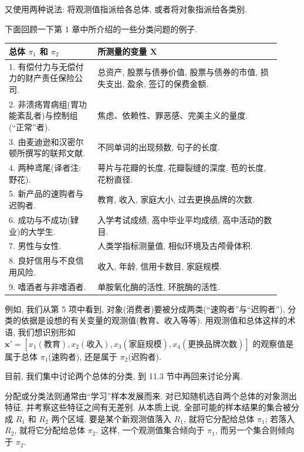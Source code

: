 
又使用两种说法: 将观测值指派给各总体, 或者将对象指派给各类别.

下面回顾一下第 1 章中所介绍的一些分类问题的例子.

\begin{mvtable}
\begin{tabular}{@{}p{0.30\linewidth}p{0.62\linewidth}@{}}
\toprule
总体 $\pi_1$ 和 $\pi_2$ & 所测量的变量 $\mathbf{X}$\\
\midrule
1. 有偿付力与无偿付力的财产责任保险公司. & 总资产, 股票与债券价值, 股票与债券的市值, 损失支出, 盈余, 签订的保费金额.\\
2. 非溃疡胃病组(胃功能紊乱者)与控制组(“正常”者). & 焦虑、依赖性、罪恶感、完美主义的量度.\\
3. 由麦迪逊和汉密尔顿所撰写的联邦文献. & 不同单词的出现频数, 句子的长度.\\
4. 两种鸢尾(译者注: 野花). & 萼片与花瓣的长度, 花瓣裂缝的深度, 苞的长度, 花粉直径.\\
5. 新产品的速购者与迟购者. & 教育, 收入, 家庭大小, 过去更换品牌的次数.\\
6. 成功与不成功(肄业)的大学生. & 入学考试成绩, 高中毕业平均成绩, 高中活动的数目.\\
7. 男性与女性. & 人类学指标测量值, 相似环境及古颅骨体积.\\
8. 良好信用与不良信用风险. & 收入, 年龄, 信用卡数目, 家庭规模.\\
9. 嗜酒者与非嗜酒者. & 单胺氧化酶的活性, 环脘酶的活性.\\
\bottomrule
\end{tabular}
\end{mvtable}

例如, 我们从第 5 项中看到, 对象(消费者)要被分成两类(“速购者”与“迟购者”), 分类的依据是设想的有关变量的观测值(教育、收入等等). 用观测值和总体这样的术语, 我们想识别形如 $\mathbf{x}'=[x_1(\text{教育}),x_2(\text{收入}),x_3(\text{家庭规模}),x_4(\text{更换品牌次数})]$ 的观察值是属于总体 $\pi_1$(速购者), 还是属于 $\pi_2$(迟购者).

目前, 我们集中讨论两个总体的分类, 到 11.3 节中再回来讨论分离.

分配或分类法则通常由“学习”样本发展而来. 对已知随机选自两个总体的对象测出特征, 并考察这些特征之间有无差别. 从本质上说, 全部可能的样本结果的集合被分成 $R_1$ 和 $R_2$ 两个区域. 要是某个新观测值落入 $R_1$, 就将它分配给总体 $\pi_1$; 若落入 $R_2$, 就将它分配给总体 $\pi_2$. 这样, 一个观测值集合倾向于 $\pi_1$, 而另一个集合则倾向于 $\pi_2$.


